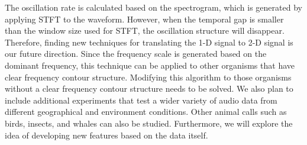 The oscillation rate is calculated based on the spectrogram, which is generated by applying STFT to the waveform. However, when the temporal gap is smaller than the window size used for STFT, the oscillation structure will disappear. Therefore, finding new techniques for translating the 1-D signal to 2-D signal is our future direction. Since the frequency scale is generated based on the dominant frequency, this technique can be applied to other organisms that have clear frequency contour structure. Modifying this algorithm to those organisms without a clear frequency contour structure needs to be solved. 
We also plan to include additional experiments that test a wider variety of audio data from different geographical and environment conditions. Other animal calls such as birds, insects, and whales can also be studied. Furthermore, we will explore the idea of developing new features based on the data itself.


